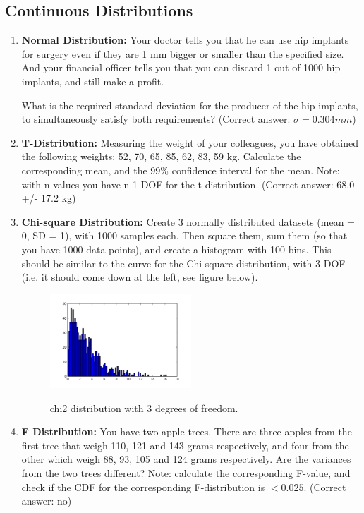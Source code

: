 \subsection*{Continuous Distributions }
\begin{enumerate}
    \item \textbf{Normal Distribution:} Your doctor tells you that he can use hip implants for surgery even if they are 1 mm bigger or smaller than the specified size. And your financial officer tells you that you can discard 1 out of 1000 hip implants, and still make a profit.

        What is the required standard deviation for the producer of the hip implants, to simultaneously satisfy both requirements?
        (Correct answer: $\sigma=0.304 mm$)
    \item \textbf{T-Distribution:} Measuring the weight of your colleagues, you have obtained the following weights: 52, 70, 65, 85, 62, 83, 59 kg.
    Calculate the corresponding mean, and the 99\% confidence interval for the mean. Note: with n values you have n-1 DOF for the t-distribution.
    (Correct answer: 68.0 +/- 17.2 kg)

    \item \textbf{Chi-square Distribution:} Create 3 normally distributed datasets (mean = 0, SD = 1), with 1000 samples each. Then square them, sum them (so that you have 1000 data-points), and create a histogram with 100 bins. This should be similar to the curve for the Chi-square distribution, with 3 DOF (i.e. it should come down at the left, see figure below).
    \begin{figure}
      \centering
      \includegraphics[width=0.5\textwidth]{../Images/chi2_3dof.png}\\
      \caption{chi2 distribution with 3 degrees of freedom.}\label{fig:chi23dof}
    \end{figure}

    \item \textbf{F Distribution:} You have two apple trees. There are three apples from the first tree that weigh 110, 121 and 143 grams respectively, and four from the other which weigh 88, 93, 105 and 124 grams respectively. Are the variances from the two trees different?
    Note: calculate the corresponding F-value, and check if the CDF for the corresponding F-distribution is $<0.025$.
    (Correct answer: no)
\end{enumerate}
